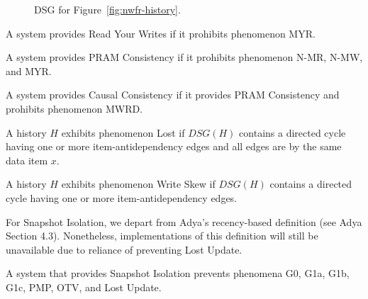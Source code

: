 \begin{figure}[H]
\centering
{}
\caption{DSG for Figure~\ref{fig:nwfr-history}.}
\label{fig:nryw-dsg}
\end{figure}

\begin{definition}
A system provides Read Your Writes if it prohibits phenomenon MYR.
\end{definition}

\begin{definition}
A system provides PRAM Consistency if it prohibits phenomenon N-MR,
N-MW, and MYR.
\end{definition}

\begin{definition}
A system provides Causal Consistency if it provides PRAM Consistency
and prohibits phenomenon MWRD.
\end{definition}

\begin{definition}
A history $H$ exhibits phenomenon Lost if $DSG(H)$ contains a directed
cycle having one or more item-antidependency edges and all edges are
by the same data item $x$.
\label{def:lostupdate}
\end{definition}

\begin{definition}
A history $H$ exhibits phenomenon Write Skew if $DSG(H)$ contains a directed
cycle having one or more item-antidependency edges.
\end{definition}

For Snapshot Isolation, we depart from Adya's recency-based definition
(see Adya Section 4.3). Nonetheless, implementations of this
definition will still be unavailable due to reliance of preventing
Lost Update.

\begin{definition}
A system that provides Snapshot Isolation prevents phenomena G0, G1a,
G1b, G1c, PMP, OTV, and Lost Update.
\end{definition}

